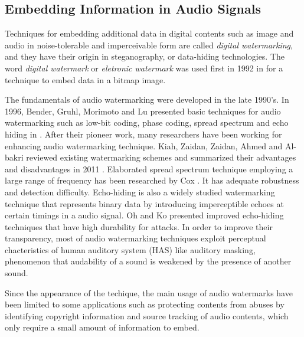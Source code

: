 \subsection{Embedding Information in Audio Signals}
Techniques for embedding additional data in digital contents such as image and audio in noise-tolerable and imperceivable form are called {\it digital watermarking}, and they have their origin in steganography, or data-hiding technologies.
The word {\it digital watermark} or {\it eletronic watermark} was used first in 1992 in \cite{tirkel1993electronic} for a technique to embed data in a bitmap image.

The fundamentals of audio watermarking were developed in the late 1990's.
In 1996, Bender, Gruhl, Morimoto and Lu presented basic techniques for audio watermarking such as low-bit coding, phase coding, spread spectrum and echo hiding in \cite{bender1996techniques}.
After their pioneer work, many researchers have been working for enhancing audio watermarking technique.
Kiah, Zaidan, Zaidan, Ahmed and Al-bakri reviewed existing watermarking schemes and summarized their advantages and disadvantages in 2011 \cite{mat2011review}.
Elaborated spread spectrum technique employing a large range of frequency has been researched by Cox \cite{cox1997secure,cox2001digital}. It has adequate robustness and detection difficulty.
Echo-hiding is also a widely studied watermarking technique that represents binary data by introducing imperceptible echoes at certain timings in a audio signal. Oh \cite{oh2001new} and Ko \cite{ko2005time} presented improved echo-hiding techniques that have high durability for attacks.
In order to improve their transparency, most of audio watermarking techniques exploit perceptual chacteristics of human auditory system (HAS) like auditory masking, phenomenon that audability of a sound is weakened by the presence of another sound.

Since the appearance of the techique, the main usage of audio watermarks have been limited to some applications such as protecting contents from abuses by identifying copyright information and source tracking of audio contents, which only require a small amount of information to embed.

